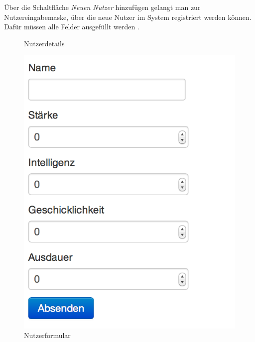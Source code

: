 Über die Schaltfläche \textit{Neuen Nutzer}  hinzufügen gelangt man zur Nutzereingabemaske, über die neue Nutzer im System registriert werden können. Dafür müssen alle Felder ausgefüllt werden .
\begin{figure}[h!]
  \centering
  \caption{Nutzerdetails}
  \label{fig:Nutzerdetails}
\end{figure}

\begin{figure}[h!]
  \centering
  \includegraphics[scale=0.5]{img/Nutzerformular.png}
  \caption{Nutzerformular}
  \label{fig:Nutzerformular}
\end{figure}

